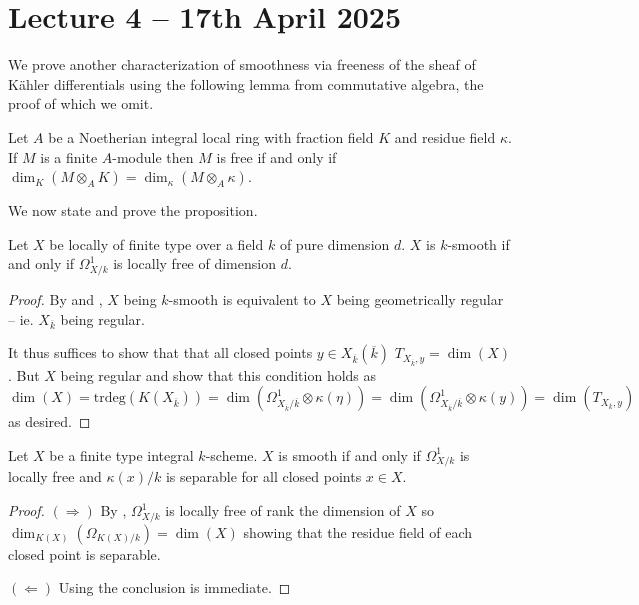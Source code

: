 \section{Lecture 4 -- 17th April 2025}\label{sec: lecture 4}
We prove another characterization of smoothness via freeness of the sheaf of K\"{a}hler differentials using the following lemma from commutative algebra, the proof of which we omit. 
\begin{lemma}\label{lem: free modules over local rings}
    Let $A$ be a Noetherian integral local ring with fraction field $K$ and residue field $\kappa$. If $M$ is a finite $A$-module then $M$ is free if and only if $\dim_{K}(M\otimes_{A}K)=\dim_{\kappa}(M\otimes_{A}\kappa)$. 
\end{lemma}
We now state and prove the proposition. 
\begin{proposition}\label{prop: smooth iff differentials are free}
    Let $X$ be locally of finite type over a field $k$ of pure dimension $d$. $X$ is $k$-smooth if and only if $\Omega_{X/k}^{1}$ is locally free of dimension $d$. 
\end{proposition}
\begin{proof}
    By  and , $X$ being $k$-smooth is equivalent to $X$ being geometrically regular -- ie. $X_{\overline{k}}$ being regular. 

    It thus suffices to show that that all closed points $y\in X_{\overline{k}}(\overline{k})$ $T_{X_{\overline{k}},y}=\dim(X)$. But $X$ being regular and  show that this condition holds as
    $$\dim(X)=\mathrm{trdeg}(K(X_{\overline{k}}))=\dim(\Omega^{1}_{X_{\overline{k}}/\overline{k}}\otimes\kappa(\eta))=\dim(\Omega_{X_{\overline{k}}/\overline{k}}^{1}\otimes\kappa(y))=\dim(T_{X_{\overline{k}},y})$$
    as desired.
\end{proof}
\begin{corollary}
    Let $X$ be a finite type integral $k$-scheme. $X$ is smooth if and only if $\Omega_{X/k}^{1}$ is locally free and $\kappa(x)/k$ is separable for all closed points $x\in X$.
\end{corollary}
\begin{proof}
    $(\Rightarrow)$ By , $\Omega_{X/k}^{1}$ is locally free of rank the dimension of $X$ so $\dim_{K(X)}(\Omega_{K(X)/k})=\dim(X)$ showing that the residue field of each closed point is separable. 

    $(\Leftarrow)$ Using  the conclusion is immediate. 
\end{proof}
